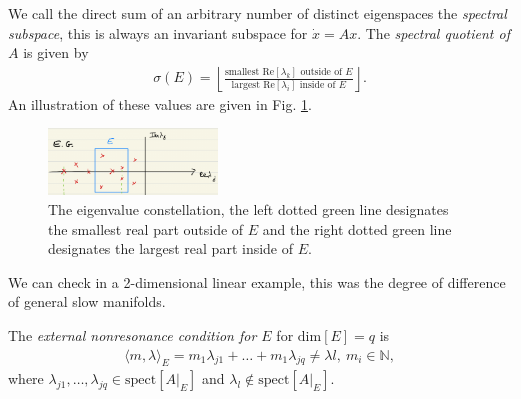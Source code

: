 We call the direct sum of an arbitrary number of distinct eigenspaces the \emph{spectral subspace}, this is always an invariant subspace for $\dot{x} = Ax$. The \emph{spectral quotient of $A$} is given by
\begin{align}
	\sigma(E) = \left\lfloor \frac{ \textrm{smallest Re} [\lambda _k] \textrm{ outside of }E}{ \textrm{largest Re} [\lambda _i]  \textrm{ inside of } E}\right\rfloor.
\end{align}
An illustration of these values are given in Fig. \ref{fig:spect_quotient}.
\begin{figure}[h!]
	\centering
	\includegraphics[width=0.4\textwidth]{figures/ch9/26spect_quot.png}
	\caption{The eigenvalue constellation, the left dotted green line designates the smallest real part outside of $E$ and the right dotted green line designates the largest real part inside of $E$.}
	\label{fig:spect_quotient}
\end{figure}

We can check in a 2-dimensional linear example, this was the degree of difference of general slow manifolds. 

The \emph{external nonresonance condition for $E$} for $ \textrm{dim} [E]=q$ is
\begin{align}
	\langle m, \lambda \rangle_{E} = m_1 \lambda _{j1} + \ldots + m_1 \lambda _{jq} \neq \lambda l,\ m_i \in \mathbb{N}	,
\end{align} 
where $\lambda _{j1},\ldots,\lambda _{jq}\in  \textrm{spect}[A|_{E}] $ and $\lambda _{l} \not \in  \textrm{spect} [A|_{E}]$.


